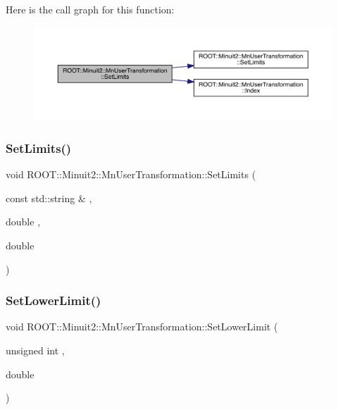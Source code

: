 Here is the call graph for this function\+:
\nopagebreak
\begin{figure}[H]
\begin{center}
\leavevmode
\includegraphics[width=350pt]{d9/d98/classROOT_1_1Minuit2_1_1MnUserTransformation_ae00c15c6e7def8b4c1c1c9d44b52e647_cgraph}
\end{center}
\end{figure}
\mbox{\label{classROOT_1_1Minuit2_1_1MnUserTransformation_ae00c15c6e7def8b4c1c1c9d44b52e647}} 
\subsubsection{\texorpdfstring{SetLimits()}{SetLimits()}\hspace{0.1cm}{\footnotesize\ttfamily [6/6]}}
{\footnotesize\ttfamily void R\+O\+O\+T\+::\+Minuit2\+::\+Mn\+User\+Transformation\+::\+Set\+Limits (\begin{DoxyParamCaption}\item[{const std\+::string \&}]{,  }\item[{double}]{,  }\item[{double}]{ }\end{DoxyParamCaption})}

\mbox{\label{classROOT_1_1Minuit2_1_1MnUserTransformation_a380498bdd8801393713fde4a4835402e}} 
\subsubsection{\texorpdfstring{SetLowerLimit()}{SetLowerLimit()}\hspace{0.1cm}{\footnotesize\ttfamily [1/6]}}
{\footnotesize\ttfamily void R\+O\+O\+T\+::\+Minuit2\+::\+Mn\+User\+Transformation\+::\+Set\+Lower\+Limit (\begin{DoxyParamCaption}\item[{unsigned int}]{,  }\item[{double}]{ }\end{DoxyParamCaption})}

